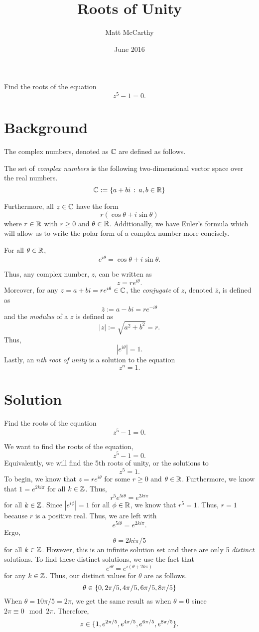 \documentclass[notitlepage]{problem-solving}
\author{Matt McCarthy}
\date{June 2016}
\title{Roots of Unity}
\begin{document}
\maketitle

\begin{problem*}
	Find the roots of the equation
	\[
		z^5-1=0.
	\]
\end{problem*}

\section{Background}

The complex numbers, denoted as $\mathbb{C}$ are defined as follows.
\begin{definition}
	The set of \textit{complex numbers} is the following two-dimensional vector space over the real numbers.
	\[
		\mathbb{C} := \lbrace a+bi\, :\, a,b\in\mathbb{R} \rbrace
	\]
\end{definition}
Furthermore, all $z\in\mathbb{C}$ have the form
\[
	r(\cos\theta+i\sin\theta)
\]
where $r\in\mathbb{R}$ with $r\geq 0$ and $\theta\in\mathbb{R}$.
Additionally, we have Euler's formula which will allow us to write the polar form of a complex number more concisely.
\begin{thm}
	For all $\theta\in\mathbb{R}$,
	\[
		e^{i\theta} = \cos\theta+i\sin\theta.
	\]
\end{thm}
Thus, any complex number, $z$, can be written as
\[
	z=re^{i\theta}.
\]
Moreover, for any $z=a+bi=re^{i\theta}\in\mathbb{C}$, the \textit{conjugate} of $z$, denoted $\bar{z}$, is defined as
\[
	\bar{z}:=a-bi=re^{-i\theta}
\]
and the \textit{modulus} of a $z$ is defined as
\[
	|z| := \sqrt{a^2+b^2} = r.
\]
Thus,
\[
	|e^{i\theta}| = 1.
\]
Lastly, an \textit{$n$th root of unity} is a solution to the equation
\[
	z^n = 1.
\]

\section{Solution}

\begin{problem*}
	Find the roots of the equation
	\[
		z^5-1=0.
	\]
\end{problem*}

We want to find the roots of the equation,
\[
	z^5 - 1= 0.
\]
Equivalently, we will find the 5th roots of unity, or the solutions to
\[
	z^5 = 1.
\]
To begin, we know that $z=re^{i\theta}$ for some $r\geq 0$ and $\theta\in\mathbb{R}$.
Furthermore, we know that $1=e^{2ki\pi}$ for all $k\in\mathbb{Z}$.
Thus,
\[
	r^5e^{5i\theta} = e^{2ki\pi}
\]
for all $k\in\mathbb{Z}$.
Since $|e^{i\phi}| = 1$ for all $\phi\in\mathbb{R}$, we know that $r^5 = 1$.
Thus, $r=1$ because $r$ is a positive real.
Thus, we are left with
\[
	e^{5i\theta}=e^{2ki\pi}.
\]
Ergo,
\[
	\theta = 2ki\pi/5
\]
for all $k\in\mathbb{Z}$.
However, this is an infinite solution set and there are only 5 \textit{distinct} solutions.
To find these distinct solutions, we use the fact that
\[
	e^{i\theta} = e^{i(\theta+2k\pi)}
\]
for any $k\in\mathbb{Z}$.
Thus, our distinct values for $\theta$ are as follows.
\[
	\theta\in\lbrace 0, 2\pi/5, 4\pi/5, 6\pi/5, 8\pi/5 \rbrace
\]
When $\theta =10\pi/5 = 2\pi$, we get the same result as when $\theta=0$ since $2\pi\equiv 0\mod{2\pi}$.
Therefore,
\[
	z\in\lbrace 1,e^{2\pi/5}, e^{4\pi/5}, e^{6\pi/5}, e^{8\pi/5} \rbrace.
\]
\end{document}
